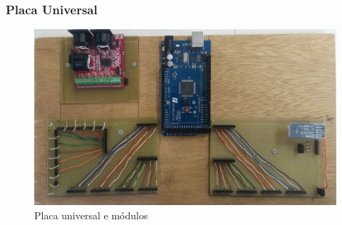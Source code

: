 \documentclass[hyperref={pdfpagelabels=false}]{beamer}
\begin{document}
                \begin{frame}\frametitle{Placa Universal}

                    \begin{figure}[H]
                    	\centering
                    	\includegraphics[scale=0.10]{Imagens/Zi01.jpg}
                    	\caption[Placa universal e módulos]{Placa universal e módulos}
                    	\label{fig:requisitos}
                    \end{figure}

                \end{frame}
\end{document}
